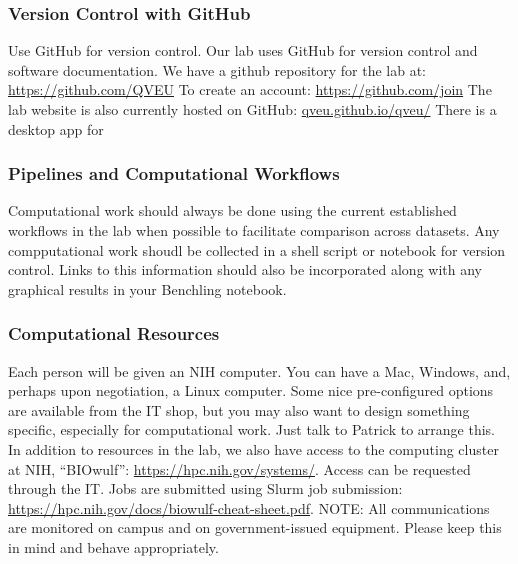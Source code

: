 \documentclass[10pt, letterpaper, twocolumn]{article} %
\begin{document}
\subsubsection{Version Control with GitHub}
Use GitHub for version control. Our lab uses GitHub for version control and software documentation. We have a github repository for the lab at: \href{https://github.com/QVEU}{https://github.com/QVEU}
To create an account: \href{https://github.com/join}{https://github.com/join}
The lab website is also currently hosted on GitHub: \href{https://qveu.github.io/QVEU/}{qveu.github.io/qveu/}
\newline
There is a desktop app for

\subsubsection{Pipelines and Computational Workflows}
Computational work should always be done using the current established workflows in the lab when possible to facilitate comparison across datasets. Any compputational work shoudl be collected in a shell script or notebook for version control. Links to this information should also be incorporated along with any graphical results in your Benchling notebook.

\subsubsection{Computational Resources}
Each person will be given an NIH computer. You can have a Mac, Windows, and, perhaps upon negotiation, a Linux computer. Some nice pre-configured options are available from the IT shop, but you may also want to design something specific, especially for computational work. Just talk to Patrick to arrange this.
In addition to resources in the lab, we also have access to the computing cluster at NIH, “BIOwulf”: \href{https://hpc.nih.gov/systems/}{https://hpc.nih.gov/systems/}. Access can be requested through the IT. Jobs are submitted using Slurm job submission: \href{https://hpc.nih.gov/docs/biowulf-cheat-sheet.pdf}{https://hpc.nih.gov/docs/biowulf-cheat-sheet.pdf}.
\newline
NOTE: All communications are monitored on campus and on government-issued equipment. Please keep this in mind and behave appropriately.
\end{document}
